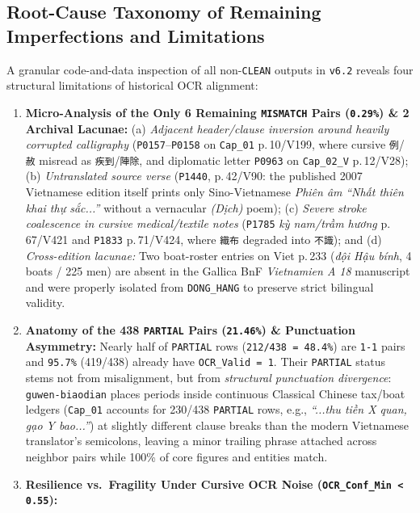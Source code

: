 \documentclass[a4paper]{article}
\begin{document}
\subsection{Root-Cause Taxonomy of Remaining Imperfections and Limitations}
A granular code-and-data inspection of all non-\texttt{CLEAN} outputs in \texttt{v6.2} reveals four structural limitations of historical OCR alignment:
\begin{enumerate}
  \item \textbf{Micro-Analysis of the Only 6 Remaining \texttt{MISMATCH} Pairs (\texttt{0.29\%}) \& 2 Archival Lacunae:}
  (a) \textit{Adjacent header/clause inversion around heavily corrupted calligraphy} (\texttt{P0157}--\texttt{P0158} on \texttt{Cap\_01} p.\,10/V199, where cursive \texttt{例}/\texttt{赦} misread as \texttt{疾到}/\texttt{陣除}, and diplomatic letter \texttt{P0963} on \texttt{Cap\_02\_V} p.\,12/V28);
  (b) \textit{Untranslated source verse} (\texttt{P1440}, p.\,42/V90: the published 2007 Vietnamese edition itself prints only Sino-Vietnamese \textit{Phiên âm} \textit{``Nhất thiên khai thự sắc...''} without a vernacular \textit{(Dịch)} poem);
  (c) \textit{Severe stroke coalescence in cursive medical/textile notes} (\texttt{P1785} \textit{kỳ nam/trầm hương} p.\,67/V421 and \texttt{P1833} p.\,71/V424, where \texttt{織布} degraded into \texttt{不識}); and
  (d) \textit{Cross-edition lacunae:} Two boat-roster entries on Viet p.\,233 (\textit{đội Hậu bính}, 4 boats / 225 men) are absent in the Gallica BnF \textit{Vietnamien A 18} manuscript and were properly isolated from \texttt{DONG\_HANG} to preserve strict bilingual validity.
  \item \textbf{Anatomy of the 438 \texttt{PARTIAL} Pairs (\texttt{21.46\%}) \& Punctuation Asymmetry:}
  Nearly half of \texttt{PARTIAL} rows (\texttt{212/438 = 48.4\%}) are \texttt{1-1} pairs and \texttt{95.7\%} (419/438) already have \texttt{OCR\_Valid = 1}. Their \texttt{PARTIAL} status stems not from misalignment, but from \textit{structural punctuation divergence}: \texttt{guwen-biaodian} places periods inside continuous Classical Chinese tax/boat ledgers (\texttt{Cap\_01} accounts for 230/438 \texttt{PARTIAL} rows, e.g., \textit{``...thu tiền X quan, gạo Y bao...''}) at slightly different clause breaks than the modern Vietnamese translator's semicolons, leaving a minor trailing phrase attached across neighbor pairs while 100\% of core figures and entities match.
  \item \textbf{Resilience vs.\ Fragility Under Cursive OCR Noise (\texttt{OCR\_Conf\_Min < 0.55}):}

\end{enumerate}
\end{document}
